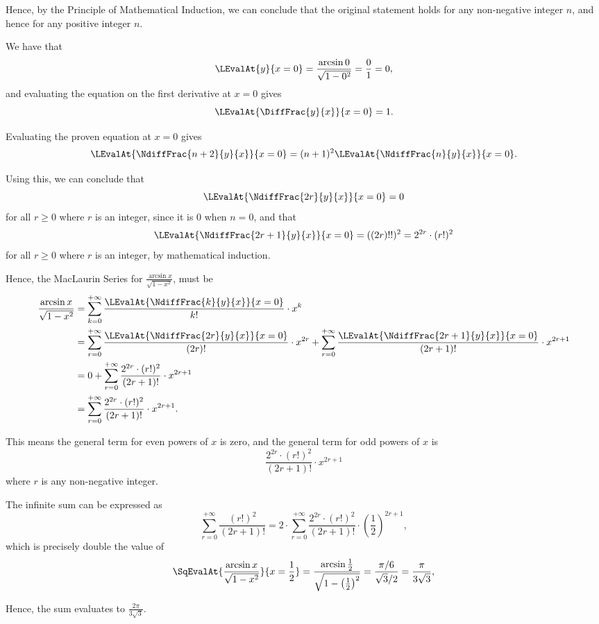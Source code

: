 Hence, by the Principle of Mathematical Induction, we can conclude that the original statement holds for any non-negative integer \(n\), and hence for any positive integer \(n\).

We have that
\[
    \LEvalAt{y}{x = 0} = \frac{\arcsin 0}{\sqrt{1 - 0^2}} = \frac{0}{1} = 0,
\]
and evaluating the equation on the first derivative at \(x = 0\) gives
\[
    \LEvalAt{\DiffFrac{y}{x}}{x = 0} = 1.
\]

Evaluating the proven equation at \(x = 0\) gives
\[
    \LEvalAt{\NdiffFrac{n + 2}{y}{x}}{x = 0} = (n + 1)^2 \LEvalAt{\NdiffFrac{n}{y}{x}}{x = 0}.
\]

Using this, we can conclude that
\[
    \LEvalAt{\NdiffFrac{2r}{y}{x}}{x = 0} = 0
\]
for all \(r \geq 0\) where \(r\) is an integer, since it is \(0\) when \(n = 0\), and that
\[
    \LEvalAt{\NdiffFrac{2r + 1}{y}{x}}{x = 0} = ((2r)!!)^2 = 2^{2r} \cdot (r!)^2
\]
for all \(r \geq 0\) where \(r\) is an integer, by mathematical induction.

Hence, the MacLaurin Series for \(\frac{\arcsin x}{\sqrt{1 - x^2}}\), must be
\begin{align*}
    \frac{\arcsin x}{\sqrt{1 - x^2}} & = \sum_{k = 0}^{+\infty} \frac{\LEvalAt{\NdiffFrac{k}{y}{x}}{x = 0}}{k!} \cdot x^k                                                                                                              \\
                                     & = \sum_{r = 0}^{+\infty} \frac{\LEvalAt{\NdiffFrac{2r}{y}{x}}{x = 0}}{(2r)!} \cdot x^{2r} + \sum_{r = 0}^{+\infty} \frac{\LEvalAt{\NdiffFrac{2r + 1}{y}{x}}{x = 0}}{(2r + 1)!} \cdot x^{2r + 1} \\
                                     & = 0 + \sum_{r = 0}^{+\infty} \frac{2^{2r} \cdot (r!)^2}{(2r + 1)!} \cdot x^{2r + 1}                                                                                                             \\
                                     & = \sum_{r = 0}^{+\infty} \frac{2^{2r} \cdot (r!)^2}{(2r + 1)!} \cdot x^{2r + 1}.
\end{align*}

This means the general term for even powers of \(x\) is zero, and the general term for odd powers of \(x\) is
\[
    \frac{2^{2r} \cdot (r!)^2}{(2r + 1)!} \cdot x^{2r + 1}
\]
where \(r\) is any non-negative integer.

The infinite sum can be expressed as
\[
    \sum_{r = 0}^{+\infty} \frac{(r!)^2}{(2r + 1)!} = 2 \cdot \sum_{r = 0}^{+\infty} \frac{2^{2r} \cdot (r!)^2}{(2r + 1)!} \cdot \left(\frac{1}{2}\right)^{2r+1},
\]
which is precisely double the value of
\[
    \SqEvalAt{\frac{\arcsin x}{\sqrt{1 - x^2}}}{x = \frac{1}{2}} = \frac{\arcsin \frac{1}{2}}{\sqrt{1 - \left(\frac{1}{2}\right)^2}} = \frac{\pi / 6}{\sqrt{3} / 2} = \frac{\pi}{3 \sqrt{3}},
\]

Hence, the sum evaluates to \(\frac{2\pi}{3 \sqrt{3}}\).